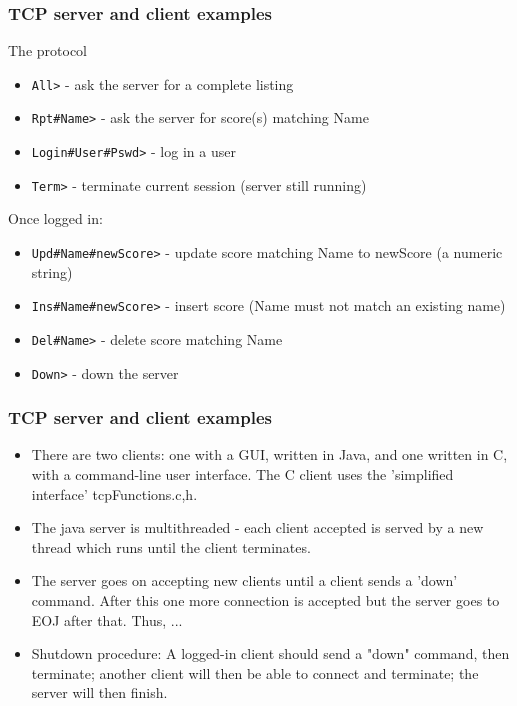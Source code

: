 \documentclass[10pt, hyperref={pdfpagelabels=false}]{beamer}
\begin{document}
\begin{frame}
\frametitle{TCP server and client examples}
The protocol
\begin{itemize}
\item \texttt{\color{brown}All>} - ask the server for a complete listing
\item \texttt{\color{brown}Rpt\#Name>} - ask the server for score(s) matching Name
\item \texttt{\color{brown}Login\#User\#Pswd>} - log in a user
\item \texttt{\color{brown}Term>} - terminate current session (server still running)
\end{itemize}

Once logged in:
\begin{itemize}
\item  \texttt{\color{brown}Upd\#Name\#newScore>} - update score matching Name to newScore (a numeric string)
\item  \texttt{\color{brown}Ins\#Name\#newScore>} - insert score (Name must not match an existing name)
\item  \texttt{\color{brown}Del\#Name>} - delete score matching Name
\item  \texttt{\color{brown}Down>} - down the server
\end{itemize}
\end{frame}

\begin{frame}
\frametitle{TCP server and client examples}
\begin{itemize}
\item There are two clients: one with a GUI, written in Java, and one written in C, with a command-line user interface. The C client uses the 'simplified interface' tcpFunctions.{c,h}.

\item The java server is multithreaded - each client accepted is served by a new thread which runs until the client terminates.

\item The server goes on accepting new clients until a client sends a 'down' command. After this one more connection is accepted but the server goes to EOJ after that. Thus, ...

\item Shutdown procedure: 
  A logged-in client should send a "down" command, then terminate; another client will then be able to connect and terminate; the server will then finish.
\end{itemize}
\end{frame}
\end{document}
